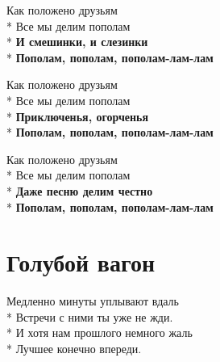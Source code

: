 \medskip

\begin{minipage}{\linewidth}
Как положено друзьям\\*
Все мы делим пополам\\*
\textbf{И смешинки, и слезинки}\\*
\textbf{Пополам, пополам, пополам-лам-лам}\\
\end{minipage}\par\medskip\nobreak

\medskip

\begin{minipage}{\linewidth}
Как положено друзьям\\*
Все мы делим пополам\\*
\textbf{Приключенья, огорченья}\\*
\textbf{Пополам, пополам, пополам-лам-лам}\\
\end{minipage}\par\medskip\nobreak

\medskip

\begin{minipage}{\linewidth}
Как положено друзьям\\*
Все мы делим пополам\\*
\textbf{Даже песню делим честно}\\*
\textbf{Пополам, пополам, пополам-лам-лам}\\
\end{minipage}

\vspace{\fill}\newpage

\section{Голубой вагон}
\label{song:Голубой_вагон}

\medskip

\begin{minipage}{\linewidth}
Медленно минуты уплывают вдаль\\*
Встречи с ними ты уже не жди.\\*
И хотя нам прошлого немного жаль\\*
Лучшее конечно впереди.\\
\end{minipage}\par\medskip\nobreak

